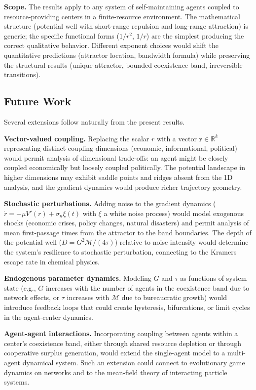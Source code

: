 \documentclass[11pt]{article}
\theoremstyle{plain}
\theoremstyle{definition}
\theoremstyle{remark}
\let\origsubsection\subsection
\renewcommand{\subsection}{\needspace{7\baselineskip}\origsubsection}
\begin{document}
\textbf{Scope.} The results apply to any system of self-maintaining
agents coupled to resource-providing centers in a finite-resource
environment. The mathematical structure (potential well with short-range
repulsion and long-range attraction) is generic; the specific functional
forms (\(1/r^2\), \(1/r\)) are the simplest producing the correct
qualitative behavior. Different exponent choices would shift the
quantitative predictions (attractor location, bandwidth formula) while
preserving the structural results (unique attractor, bounded coexistence
band, irreversible transitions).

\subsection{Future Work}\label{future-work}

Several extensions follow naturally from the present results.

\textbf{Vector-valued coupling.} Replacing the scalar \(r\) with a
vector \(\mathbf{r} \in \mathbb{R}^k\) representing distinct coupling
dimensions (economic, informational, political) would permit analysis of
dimensional trade-offs: an agent might be closely coupled economically
but loosely coupled politically. The potential landscape in higher
dimensions may exhibit saddle points and ridges absent from the 1D
analysis, and the gradient dynamics would produce richer trajectory
geometry.

\textbf{Stochastic perturbations.} Adding noise to the gradient dynamics
(\(\dot{r} = -\mu V'(r) + \sigma_n \xi(t)\) with \(\xi\) a white noise
process) would model exogenous shocks (economic crises, policy changes,
natural disasters) and permit analysis of mean first-passage times from
the attractor to the band boundaries. The depth of the potential well
(\(D = G^2\mathcal{M}/(4\tau)\)) relative to noise intensity would
determine the system's resilience to stochastic perturbation, connecting
to the Kramers escape rate in chemical physics.

\textbf{Endogenous parameter dynamics.} Modeling \(G\) and \(\tau\) as
functions of system state (e.g., \(G\) increases with the number of
agents in the coexistence band due to network effects, or \(\tau\)
increases with \(\mathcal{M}\) due to bureaucratic growth) would
introduce feedback loops that could create hysteresis, bifurcations, or
limit cycles in the agent-center dynamics.

\textbf{Agent-agent interactions.} Incorporating coupling between agents
within a center's coexistence band, either through shared resource
depletion or through cooperative surplus generation, would extend the
single-agent model to a multi-agent dynamical system. Such an extension
could connect to evolutionary game dynamics on networks and to the
mean-field theory of interacting particle systems.
\end{document}
